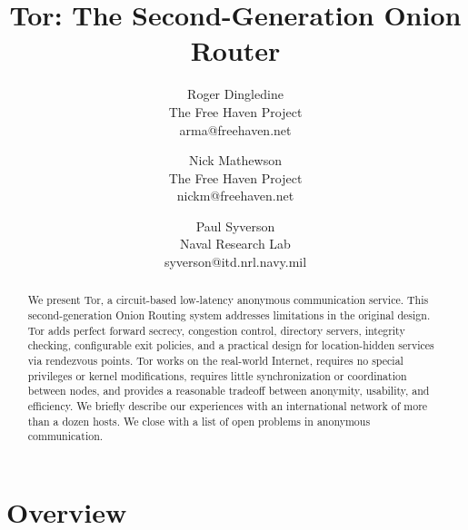\documentclass[twocolumn]{article}
\begin{document}

\title{Tor: The Second-Generation Onion Router} %

\author{Roger Dingledine \\ The Free Haven Project \\ arma@freehaven.net \and
Nick Mathewson \\ The Free Haven Project \\ nickm@freehaven.net \and
Paul Syverson \\ Naval Research Lab \\ syverson@itd.nrl.navy.mil}

\maketitle
\thispagestyle{empty}

\begin{abstract}
We present Tor, a circuit-based low-latency anonymous communication
service. This second-generation Onion Routing system addresses limitations
in the original design. Tor adds perfect forward secrecy, congestion
control, directory servers, integrity checking, configurable exit policies,
and a practical design for location-hidden services via rendezvous
points. Tor works on the real-world
Internet, requires no special privileges or kernel modifications, requires
little synchronization or coordination between nodes, and provides a
reasonable tradeoff between anonymity, usability, and efficiency.
We briefly describe our experiences with an international network of
more than a dozen hosts. %
We close with a list of open problems in anonymous communication.
\end{abstract}



\section{Overview}
\label{sec:intro}
\end{document}
